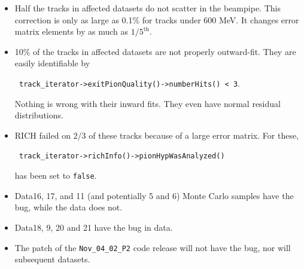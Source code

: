 \begin{slide*}

\slideframe{}
\huge
{}
\Large

\begin{minipage}[t]{\linewidth}

\begin{itemize}

  \vspace{0.3cm}

  \item Half the tracks in affected datasets do not scatter in the
  beampipe.  This correction is only as large as 0.1\% for tracks
  under 600 MeV.  It changes error matrix elements by as much as
  $1/5^{\mbox{th}}$.

  \vspace{0.3cm}

  \item 10\% of the tracks in affected datasets are not properly
  outward-fit.  They are easily identifiable by
  \begin{center}{\tt
  track\_iterator->exitPionQuality()->numberHits() < 3}.\end{center}
  Nothing is wrong with their inward fits.  They even have normal
  residual distributions.

  \vspace{0.3cm}

  \item RICH failed on $2/3$ of these tracks because of a large error
  matrix.  For these,
  \begin{center}{\tt
  track\_iterator->richInfo()->pionHypWasAnalyzed()}\end{center}
  has been set to {\tt false}.

  \vspace{0.3cm}

  \item Data16, 17, and 11 (and potentially 5 and 6) Monte Carlo
  samples have the bug, while the data does not.

  \vspace{0.3cm}

  \item Data18, 9, 20 and 21 have the bug in data.

  \vspace{0.3cm}

  \item The patch of the {\tt Nov\_04\_02\_P2} code release will not
  have the bug, nor will subsequent datasets.

\end{itemize}

\end{minipage}

\end{slide*}

